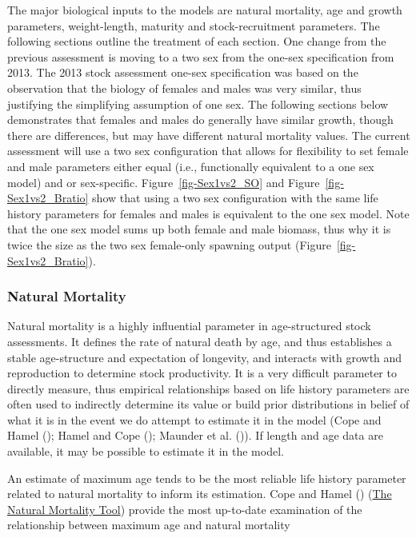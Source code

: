 \documentclass[
]{scrartcl}
\begin{document}
The major biological inputs to the models are natural mortality, age and
growth parameters, weight-length, maturity and stock-recruitment
parameters. The following sections outline the treatment of each
section. One change from the previous assessment is moving to a two sex
from the one-sex specification from 2013. The 2013 stock assessment
one-sex specification was based on the observation that the biology of
females and males was very similar, thus justifying the simplifying
assumption of one sex. The following sections below demonstrates that
females and males do generally have similar growth, though there are
differences, but may have different natural mortality values. The
current assessment will use a two sex configuration that allows for
flexibility to set female and male parameters either equal (i.e.,
functionally equivalent to a one sex model) and or sex-specific.
Figure~\ref{fig-Sex1vs2_SO} and Figure~\ref{fig-Sex1vs2_Bratio} show
that using a two sex configuration with the same life history parameters
for females and males is equivalent to the one sex model. Note that the
one sex model sums up both female and male biomass, thus why it is twice
the size as the two sex female-only spawning output
(Figure~\ref{fig-Sex1vs2_Bratio}).

\subsubsection{Natural Mortality}\label{natural-mortality}

Natural mortality is a highly influential parameter in age-structured
stock assessments. It defines the rate of natural death by age, and thus
establishes a stable age-structure and expectation of longevity, and
interacts with growth and reproduction to determine stock productivity.
It is a very difficult parameter to directly measure, thus empirical
relationships based on life history parameters are often used to
indirectly determine its value or build prior distributions in belief of
what it is in the event we do attempt to estimate it in the model (Cope
and Hamel (); Hamel and Cope
(); Maunder et al.
()). If length and age data are
available, it may be possible to estimate it in the model.

An estimate of maximum age tends to be the most reliable life history
parameter related to natural mortality to inform its estimation. Cope
and Hamel ()
(\href{https://connect.fisheries.noaa.gov/natural-mortality-tool/}{The
Natural Mortality Tool}) provide the most up-to-date examination of the
relationship between maximum age and natural mortality
\end{document}

